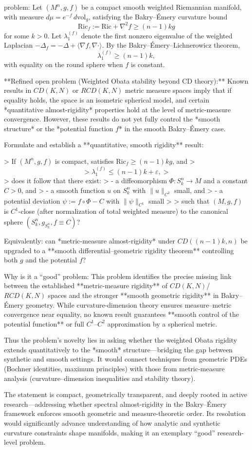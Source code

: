 problem:  
Let \((M^n, g, f)\) be a compact smooth weighted Riemannian manifold, with measure \(d\mu = e^{-f} \, d\mathrm{vol}_g\), satisfying the Bakry–Émery curvature bound  
\[
\mathrm{Ric}_f := \mathrm{Ric} + \nabla^2 f \ge (n-1)k g
\]
for some \(k>0\).  
Let \(\lambda_1^{(f)}\) denote the first nonzero eigenvalue of the weighted Laplacian \(-\Delta_f = -\Delta + \langle \nabla f, \nabla \cdot \rangle\).  
By the Bakry–Émery–Lichnerowicz theorem,  
\[
\lambda_1^{(f)} \ge (n-1)k,
\]
with equality on the round sphere when \(f\) is constant.

**Refined open problem (Weighted Obata stability beyond CD theory):**  
Known results in \(CD(K,N)\) or \(RCD(K,N)\) metric measure spaces imply that if equality holds, the space is an isometric spherical model, and certain *quantitative almost-rigidity* properties hold at the level of metric-measure convergence. However, these results do not yet fully control the *smooth structure* or the *potential function \(f\)* in the smooth Bakry–Émery case.

Formulate and establish a **quantitative, smooth rigidity** result:

> If \((M^n,g,f)\) is compact, satisfies \(\mathrm{Ric}_f \ge (n-1)k g\), and  
> \[
> \lambda_1^{(f)} \le (n-1)k + \varepsilon,
> \]
> does it follow that there exist:
> - a diffeomorphism \(\Phi: S^n_k \to M\) and a constant \(C>0\), and  
> - a smooth function \(u\) on \(S^n_k\) with \(\|u\|_{C^2}\) small, and  
> - a potential deviation \(\psi := f \circ \Phi - C\) with \(\|\psi\|_{C^1}\) small
> 
> such that \((M,g,f)\) is \(C^1\)-close (after normalization of total weighted measure) to the canonical sphere \((S^n_k, g_{S^n_k}, f\equiv C)\)?

Equivalently: can *metric-measure almost-rigidity* under \(CD((n-1)k,n)\) be upgraded to a **smooth differential–geometric rigidity theorem** controlling both \(g\) and the potential \(f\)?

Why is it a “good” problem:  
This problem identifies the precise missing link between the established **metric-measure rigidity** of \(CD(K,N)\)/\(RCD(K,N)\) spaces and the stronger **smooth geometric rigidity** in Bakry–Émery geometry. While curvature-dimension theory ensures measure–metric convergence near equality, no known result guarantees **smooth control of the potential function** or full \(C^1\)–\(C^2\) approximation by a spherical metric.  

Thus the problem’s novelty lies in asking whether the weighted Obata rigidity extends quantitatively to the *smooth* structure—bridging the gap between synthetic and smooth settings. It would connect techniques from geometric PDEs (Bochner identities, maximum principles) with those from metric-measure analysis (curvature–dimension inequalities and stability theory).  

The statement is compact, geometrically transparent, and deeply rooted in active research—addressing whether spectral almost-rigidity in the Bakry–Émery framework enforces smooth geometric and measure-theoretic order. Its resolution would significantly advance understanding of how analytic and synthetic curvature constraints shape manifolds, making it an exemplary “good” research-level problem.